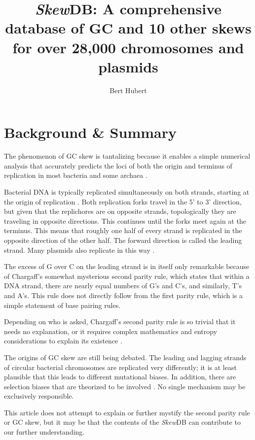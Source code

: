 \documentclass[fleqn,10pt]{wlscirep}
\title{\emph{Skew}DB: A comprehensive database of GC and 10 other skews for over 28,000 chromosomes and plasmids}
\author[*]{Bert Hubert}
\affil[*]{corresponding author: Bert Hubert (bert@hubertnet.nl)}
\begin{document}
\flushbottom
\maketitle
\thispagestyle{empty}

\section*{Background \& Summary}
The phenomenon of GC skew is tantalizing because it enables a simple numerical analysis that accurately predicts the loci of both the origin and terminus of replication in most bacteria and some archaea \cite{lu_skewit_2020} \cite{luo_doric_2019}.

Bacterial DNA is typically replicated simultaneously on both strands, starting at the origin of replication \cite{ODonnell2013}. Both replication forks travel in the 5' to 3' direction, but given that the replichores are on opposite strands, topologically they are traveling in opposite directions. This continues until the forks meet again at the terminus. This means that roughly one half of every strand is replicated in the opposite direction of the other half. The forward direction is called the leading strand. Many plasmids also replicate in this way \cite{Lilly2015}.

The excess of G over C on the leading strand is in itself only remarkable because of Chargaff's somewhat mysterious second parity rule\cite{rudner_separation_1968}, which states that within a DNA strand, there are nearly equal numbers of G's and C's, and similarly, T's and A's. This rule does not directly follow from the first parity rule, which is a simple statement of base pairing rules.

Depending on who is asked, Chargaff's second parity rule is so trivial that it needs no explanation, or it requires complex mathematics and entropy considerations to explain its existence \cite{fariselli_dna_2020}.

The origins of GC skew are still being debated. The leading and lagging strands of circular bacterial chromosomes are replicated very differently; it is at least plausible that this leads to different mutational biases. In addition, there are selection biases that are theorized to be involved \cite{tillier_contributions_2000}. No single mechanism may be exclusively responsible.

This article does not attempt to explain or further mystify \cite{zhang_brief_2014} the second parity rule or GC skew, but it may be that the contents of the \emph{Skew}DB can contribute to our further understanding.
\end{document}
